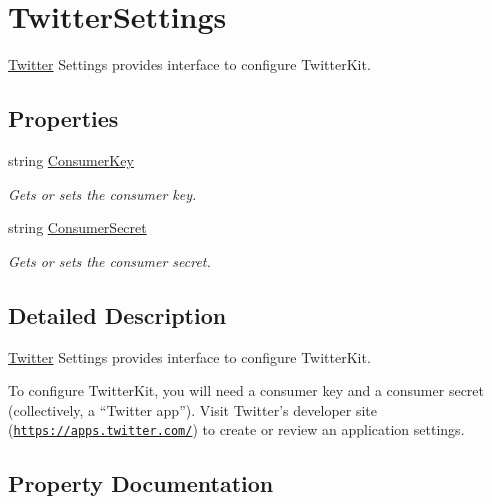 \hypertarget{class_voxel_busters_1_1_native_plugins_1_1_twitter_settings}{}\section{Twitter\+Settings}
\label{class_voxel_busters_1_1_native_plugins_1_1_twitter_settings}


\hyperlink{class_voxel_busters_1_1_native_plugins_1_1_twitter}{Twitter} Settings provides interface to configure Twitter\+Kit.  


\subsection*{Properties}
\begin{DoxyCompactItemize}
\item 
string \hyperlink{class_voxel_busters_1_1_native_plugins_1_1_twitter_settings_a5267c602639337404fedf8434230c419}{Consumer\+Key}
\begin{DoxyCompactList}\small\item\em Gets or sets the consumer key. \end{DoxyCompactList}\item 
string \hyperlink{class_voxel_busters_1_1_native_plugins_1_1_twitter_settings_a0a748ac54ae47a48664b279e952dba97}{Consumer\+Secret}
\begin{DoxyCompactList}\small\item\em Gets or sets the consumer secret. \end{DoxyCompactList}\end{DoxyCompactItemize}


\subsection{Detailed Description}
\hyperlink{class_voxel_busters_1_1_native_plugins_1_1_twitter}{Twitter} Settings provides interface to configure Twitter\+Kit. 

To configure Twitter\+Kit, you will need a consumer key and a consumer secret (collectively, a “\+Twitter app”). Visit Twitter’s developer site (\href{https://apps.twitter.com/}{\tt https\+://apps.\+twitter.\+com/}) to create or review an application settings.  

\subsection{Property Documentation}
\hypertarget{class_voxel_busters_1_1_native_plugins_1_1_twitter_settings_a5267c602639337404fedf8434230c419}{}
